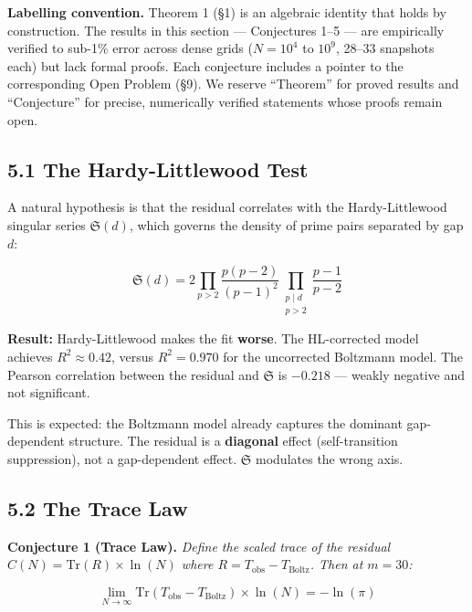 \documentclass[
  11pt,
]{article}
\numberwithin{equation}{section}
\begin{document}
\textbf{Labelling convention.} Theorem 1 (§1) is an algebraic identity
that holds by construction. The results in this section --- Conjectures
1--5 --- are empirically verified to sub-1\% error across dense grids
(\(N = 10^4\) to \(10^9\), 28--33 snapshots each) but lack formal
proofs. Each conjecture includes a pointer to the corresponding Open
Problem (§9). We reserve ``Theorem'' for proved results and
``Conjecture'' for precise, numerically verified statements whose proofs
remain open.

\subsection{5.1 The Hardy-Littlewood
Test}\label{the-hardy-littlewood-test}

A natural hypothesis is that the residual correlates with the
Hardy-Littlewood singular series \(\mathfrak{S}(d)\), which governs the
density of prime pairs separated by gap \(d\):

\begin{equation}\mathfrak{S}(d) = 2 \prod_{p > 2} \frac{p(p-2)}{(p-1)^2} \prod_{\substack{p \mid d \\ p > 2}} \frac{p-1}{p-2}\end{equation}

\textbf{Result:} Hardy-Littlewood makes the fit \textbf{worse}. The
HL-corrected model achieves \(R^2 \approx 0.42\), versus \(R^2 = 0.970\)
for the uncorrected Boltzmann model. The Pearson correlation between the
residual and \(\mathfrak{S}\) is \(-0.218\) --- weakly negative and not
significant.

This is expected: the Boltzmann model already captures the dominant
gap-dependent structure. The residual is a \textbf{diagonal} effect
(self-transition suppression), not a gap-dependent effect.
\(\mathfrak{S}\) modulates the wrong axis.

\subsection{5.2 The Trace Law}\label{the-trace-law}

\textbf{Conjecture 1 (Trace Law).} \emph{Define the scaled trace of the
residual \(C(N) = \text{Tr}(R) \times \ln(N)\) where
\(R = T_{\text{obs}} - T_{\text{Boltz}}\). Then at \(m = 30\):}

\begin{equation}\boxed{\lim_{N \to \infty} \text{Tr}(T_{\text{obs}} - T_{\text{Boltz}}) \times \ln(N) = -\ln(\pi)}\end{equation}
\end{document}
